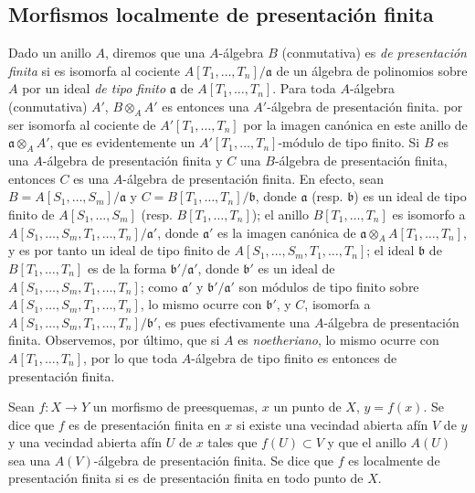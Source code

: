 \subsection{Morfismos localmente de presentación finita}
\label{subsection:IV.1.4-fr}

\begin{env}[1.4.1]
\label{IV.1.4.1-fr}
Dado un anillo $A$, diremos que una $A$-álgebra $B$ (conmutativa)
es \emph{de presentación finita} si es isomorfa al cociente
$A[T_1,\ldots,T_n]/\mathfrak a$ de un álgebra de polinomios sobre $A$ por un
ideal \emph{de tipo finito} $\mathfrak a$ de $A[T_1,\ldots,T_n]$. Para toda
$A$-álgebra (conmutativa) $A'$, $B\otimes_AA'$ es entonces una $A'$-álgebra de
presentación finita. por ser isomorfa al cociente de $A'[T_1,\ldots,T_n]$ por
la imagen canónica en este anillo de $\mathfrak a\otimes_AA'$, que es
evidentemente un $A'[T_1,\ldots,T_n]$-módulo de tipo finito. Si $B$ es una
$A$-álgebra de presentación finita y $C$ una $B$-álgebra de presentación
finita, entonces $C$ es una $A$-álgebra de presentación finita. En efecto, sean
$B=A[S_1,\ldots,S_m]/\mathfrak a$ y
$C=B[T_1,\ldots,T_n]/\mathfrak b$, donde $\mathfrak a$ (resp. $\mathfrak b$) es
un ideal de tipo finito de $A[S_1,\ldots,S_m]$ (resp.
$B[T_1,\ldots,T_n]$); el anillo $B[T_1,\ldots,T_n]$ es isomorfo a
$A[S_1,\ldots,S_m,T_1,\ldots,T_n]/\mathfrak a'$, donde $\mathfrak a'$ es
la imagen canónica de
$\mathfrak a\otimes_AA[T_1,\ldots,T_n]$, y es por tanto un ideal de tipo finito de
$A[S_1,\ldots,S_m,T_1,\ldots,T_n]$; el ideal $\mathfrak b$ de
$B[T_1,\ldots,T_n]$ es de la forma $\mathfrak b'/\mathfrak a'$, donde
$\mathfrak b'$ es un ideal de $A[S_1,\ldots,S_m,T_1,\ldots,T_n]$; como
$\mathfrak a'$ y $\mathfrak b'/\mathfrak a'$ son módulos de tipo finito
sobre $A[S_1,\ldots,S_m,T_1,\ldots,T_n]$, lo mismo ocurre con $\mathfrak b'$,
y $C$, isomorfa a
$A[S_1,\ldots,S_m,T_1,\ldots,T_n]/\mathfrak b'$, es pues efectivamente una
$A$-álgebra de presentación finita. Observemos, por último, que si $A$ es
\emph{noetheriano}, lo mismo ocurre con $A[T_1,\ldots,T_n]$, por lo que toda
$A$-álgebra de tipo finito es entonces de presentación finita.
\end{env}

\begin{definition}[1.4.2]
\label{IV.1.4.2-fr}
Sean $f:X\to Y$ un morfismo de preesquemas, $x$ un punto de $X$, $y=f(x)$.
Se dice que $f$ es de presentación finita en $x$ si existe una vecindad
abierta afín $V$ de $y$ y una vecindad abierta afín $U$ de $x$ tales que
$f(U)\subset V$ y que el anillo $A(U)$ sea una $A(V)$-álgebra de presentación
finita. Se dice que $f$ es localmente de presentación finita si es de
presentación finita en todo punto de $X$.
\end{definition}

